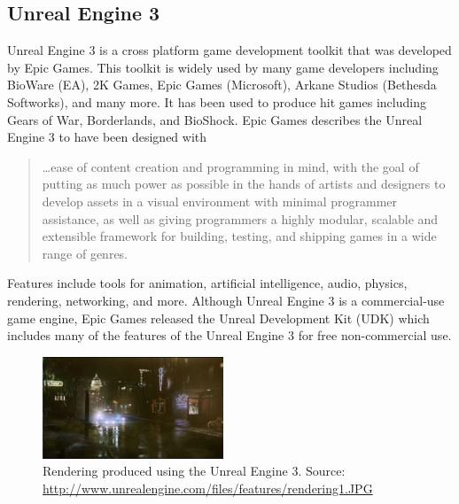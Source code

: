 \subsection{Unreal Engine 3}
Unreal Engine 3 is a cross platform game development toolkit that was developed by Epic Games. This toolkit is widely used by many game developers including BioWare (EA), 2K Games, Epic Games (Microsoft), Arkane Studios (Bethesda Softworks), and many more. It has been used to produce hit games including Gears of War, Borderlands, and BioShock. Epic Games describes the Unreal Engine 3 to have been designed with

\begin{quote}
\ldots ease of content creation and programming in mind, with the goal of putting as much power as possible in the hands of artists and designers to develop assets in a visual environment with minimal programmer assistance, as well as giving programmers a highly modular, scalable and extensible framework for building, testing, and shipping games in a wide range of genres. \cite{unreal_engine_3}
\end{quote}

Features include tools for animation, artificial intelligence, audio, physics, rendering, networking, and more. Although Unreal Engine 3 is a commercial-use game engine, Epic Games released the Unreal Development Kit (UDK) which includes many of the features of the Unreal Engine 3 for free non-commercial use.

\begin{figure}[h!]
  \centering \includegraphics[width=0.48\textwidth]{Images/unreal_engine3_rendering.jpg}
	\caption{Rendering produced using the Unreal Engine 3. Source: \url{http://www.unrealengine.com/files/features/rendering1.JPG}}
\end{figure}


